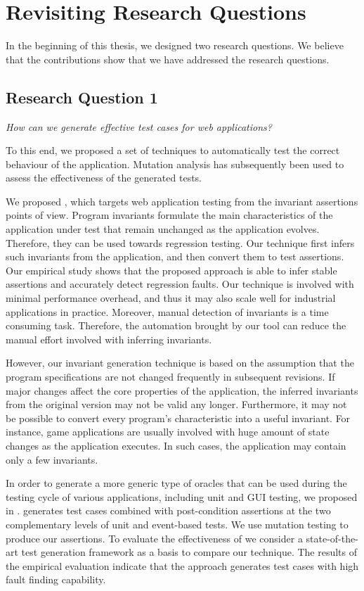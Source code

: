 \section{Revisiting Research Questions} 
In the beginning of this thesis, we designed two research questions. We believe that the contributions show that we have addressed the research questions.
\subsection{Research Question 1}

\emph{How can we generate effective test cases for \javascript web applications?}

To this end, we proposed a set of techniques to automatically test the correct behaviour of the application. Mutation analysis has subsequently been used to assess the effectiveness of the generated tests. 

 We proposed \jsart, which targets web application testing from the invariant assertions points of view. Program invariants formulate the main characteristics of the application under test that remain unchanged as the application evolves. Therefore, they can be used towards regression testing. Our technique first infers such invariants from the application, and then convert them to test assertions. Our empirical study shows that the proposed approach is able to infer stable assertions and accurately detect regression faults. Our technique is involved with minimal performance overhead, and thus it may also scale well for industrial applications in practice.  Moreover, manual detection of invariants is a time consuming task. Therefore, the automation brought by our tool can reduce the manual effort involved with inferring invariants. 

However, our invariant generation technique is based on the assumption that the program specifications are not changed frequently in subsequent revisions. If major changes affect the core properties of the application, the inferred invariants from the original version may not be valid any longer. Furthermore, it may not be possible to convert every program's characteristic into a useful invariant. For instance, game applications are usually involved with huge amount of state changes as the application executes. In such cases, the application may contain only a few invariants. 

 In order to generate a more generic type of oracles that can be used during the testing cycle of various applications, including unit and GUI testing, we proposed \jseft in . \jseft generates test cases combined with post-condition assertions at the two complementary levels of unit and event-based tests. We use mutation testing to produce our assertions. 
To evaluate the effectiveness of \jseft we consider a state-of-the-art \javascript test generation framework as a basis to compare our technique. The results of the empirical evaluation indicate that the approach generates test cases with high fault finding capability.

